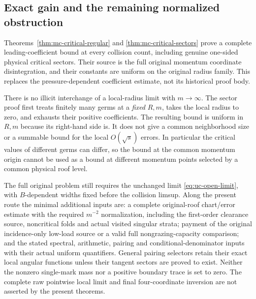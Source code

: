 \subsection{Exact gain and the remaining normalized obstruction}
Theorems~\ref{thm:mc-critical-regular} and
\ref{thm:mc-critical-sectors} prove a complete leading-coefficient
bound at every collision count, including genuine one-sided physical
critical sectors. Their source is the full original momentum
coordinate disintegration, and their constants are uniform on the
original radius family. This replaces the pressure-dependent
coefficient estimate, not its historical proof body.

There is no illicit interchange of a local-radius limit with $m\to\infty$.
The sector proof first treats finitely many germs at a \emph{fixed}
$R,m$, takes the local radius to zero, and exhausts their positive
coefficients. The resulting bound is uniform in $R,m$ because its
right-hand side is. It does not give a common neighborhood size or a
summable bound for the local $O(\sqrt s)$ errors. In particular the
critical values of different germs can differ, so the bound at the
common momentum origin cannot be used as a bound at different
momentum points selected by a common physical roof level.

The full original problem still requires the unchanged limit
\eqref{eq:uc-open-limit}, with $B$-dependent widths fixed before the
collision limsup. Along the present route the minimal additional
inputs are: a complete original-roof chart/error estimate with the
required $m^{-2}$ normalization, including the first-order clearance
source, noncritical folds and actual visited singular strata; payment
of the original incidence-only low-load source or a valid full
nongrazing-capacity comparison; and the stated spectral, arithmetic,
pairing and conditional-denominator inputs with their actual uniform
quantifiers. General pairing selectors retain their exact local
angular functions unless their tangent sectors are proved to exist.
Neither the nonzero single-mark mass nor a positive boundary trace
is set to zero. The complete raw pointwise local limit and final
four-coordinate inversion are not asserted by the present theorems.
